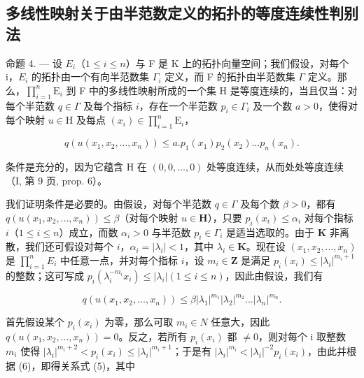 \subsection{多线性映射关于由半范数定义的拓扑的等度连续性判别法}

命题 4. --- 设 \(E_{i}\)（\(1 \leqslant i \leqslant n\)）与 F 是 K 上的拓扑向量空间；我们假设，对每个 i，\(E_{i}\) 的拓扑由一个有向半范数集 \(\Gamma_{i}\) 定义，而 F 的拓扑由半范数集 \(\Gamma\) 定义。那么，\(\prod_{i=1}^{n} \mathrm{E}_{i}\) 到 F 中的多线性映射所成的一个集 H 是等度连续的，当且仅当：对每个半范数 \(q \in \Gamma\) 及每个指标 \(i\)，存在一个半范数 \(p_{i} \in \Gamma_{i}\) 及一个数 \(a > 0\)，使得对每个映射 \(u \in \mathrm{H}\) 及每点 \((x_{i}) \in \prod_{i=1}^{n} \mathrm{E}_{i}\)，

\[
q \left(u \left(x _ {1}, x _ {2}, \dots , x _ {n}\right)\right) \leqslant a. p _ {1} \left(x _ {1}\right) p _ {2} \left(x _ {2}\right) \dots p _ {n} \left(x _ {n}\right).\tag{5}
\]

条件是充分的，因为它蕴含 H 在 \((0, 0, \ldots, 0)\) 处等度连续，从而处处等度连续（I, 第 9 页, prop. 6）。

我们证明条件是必要的。由假设，对每个半范数 \(q \in \Gamma\) 及每个数 \(\beta > 0\)，都有 \(q(u(x_1, x_2, ..., x_n)) \leqslant \beta\)（对每个映射 \(u \in \mathbf{H}\)），只要 \(p_i(x_i) \leqslant \alpha_i\) 对每个指标 \(i\)（\(1 \leqslant i \leqslant n\)）成立，而数 \(\alpha_i > 0\) 与半范数 \(p_i \in \Gamma_i\) 是适当选取的。由于 \(\mathbf{K}\) 非离散，我们还可假设对每个 \(i\)，\(\alpha_i = |\lambda_i| < 1\)，其中 \(\lambda_i \in \mathbf{K}\)。现在设 \((x_1, x_2, ..., x_n)\) 是 \(\prod_{i=1}^{n} E_i\) 中任意一点，并对每个指标 \(i\)，设 \(m_i \in \mathbf{Z}\) 是满足 \(p_i(x_i) \leqslant |\lambda_i|^{m_i + 1}\) 的整数；这可写成 \(p_i(\lambda_i^{-m_i} x_i) \leqslant |\lambda_i| (1 \leqslant i \leqslant n)\)，因此由假设，我们有

\[
q \left(u \left(x _ {1}, x _ {2}, \dots , x _ {n}\right)\right) \leqslant \beta \left| \lambda_ {1} \right| ^ {m _ {1}} \left| \lambda_ {2} \right| ^ {m _ {2}} \dots \left| \lambda_ {n} \right| ^ {m _ {n}}.\tag{6}
\]

首先假设某个 \(p_{i}(x_{i})\) 为零，那么可取 \(m_{i} \in N\) 任意大，因此 \(q(u(x_{1}, x_{2}, ..., x_{n})) = 0\)。反之，若所有 \(p_{i}(x_{i})\) 都 \(\neq 0\)，则对每个 i 取整数 \(m_{i}\) 使得 \(|\lambda_{i}|^{m_{i}+2} < p_{i}(x_{i}) \leqslant |\lambda_{i}|^{m_{i}+1}\)；于是有 \(|\lambda_{i}|^{m_{i}} < |\lambda_{i}|^{-2}p_{i}(x_{i})\)，由此并根据 (6)，即得关系式 (5)，其中

